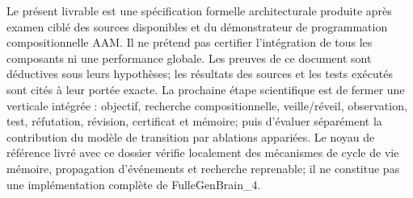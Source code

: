 \documentclass[11pt,a4paper]{article}
\begin{document}
Le présent livrable est une spécification formelle architecturale produite après examen ciblé des sources disponibles et du démonstrateur de programmation compositionnelle AAM. Il ne prétend pas certifier l'intégration de tous les composants ni une performance globale. Les preuves de ce document sont déductives sous leurs hypothèses; les résultats des sources et les tests exécutés sont cités à leur portée exacte. La prochaine étape scientifique est de fermer une verticale intégrée : objectif, recherche compositionnelle, veille/réveil, observation, test, réfutation, révision, certificat et mémoire; puis d'évaluer séparément la contribution du modèle de transition par ablations appariées. Le noyau de référence livré avec ce dossier vérifie localement des mécanismes de cycle de vie mémoire, propagation d'événements et recherche reprenable; il ne constitue pas une implémentation complète de FulleGenBrain\_4.
\end{document}
